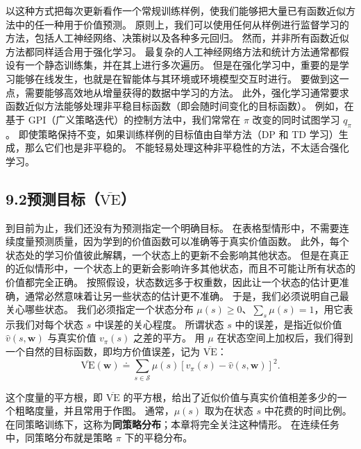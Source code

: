 \documentclass[UTF8,12pt,a4paper,fontset=fandol]{ctexart}
\begin{document}
以这种方式把每次更新看作一个常规训练样例，使我们能够把大量已有函数近似方法中的任一种用于价值预测。
原则上，我们可以使用任何从样例进行监督学习的方法，包括人工神经网络、决策树以及各种多元回归。
然而，并非所有函数近似方法都同样适合用于强化学习。
最复杂的人工神经网络方法和统计方法通常都假设有一个静态训练集，并在其上进行多次遍历。
但是在强化学习中，重要的是学习能够在线发生，也就是在智能体与其环境或环境模型交互时进行。
要做到这一点，需要能够高效地从增量获得的数据中学习的方法。
此外，强化学习通常要求函数近似方法能够处理非平稳目标函数（即会随时间变化的目标函数）。
例如，在基于 GPI（广义策略迭代）的控制方法中，我们常常在 $\pi$ 改变的同时试图学习 $q_\pi$。
即使策略保持不变，如果训练样例的目标值由自举方法（DP 和 TD 学习）生成，那么它们也是非平稳的。
不能轻易处理这种非平稳性的方法，不太适合强化学习。

\subsection*{9.2\quad 预测目标（$\overline{\mathrm{VE}}$）}

到目前为止，我们还没有为预测指定一个明确目标。
在表格型情形中，不需要连续度量预测质量，因为学到的价值函数可以准确等于真实价值函数。
此外，每个状态处的学习价值彼此解耦，一个状态上的更新不会影响其他状态。
但是在真正的近似情形中，一个状态上的更新会影响许多其他状态，而且不可能让所有状态的价值都完全正确。
按照假设，状态数远多于权重数，因此让一个状态的估计更准确，通常必然意味着让另一些状态的估计更不准确。
于是，我们必须说明自己最关心哪些状态。
我们必须指定一个状态分布 $\mu(s)\ge 0$、$\sum_s\mu(s)=1$，用它表示我们对每个状态 $s$ 中误差的关心程度。
所谓状态 $s$ 中的误差，是指近似价值 $\hat{v}(s,\mathbf{w})$ 与真实价值 $v_\pi(s)$ 之差的平方。
用 $\mu$ 在状态空间上加权后，我们得到一个自然的目标函数，即均方价值误差，记为 $\overline{\mathrm{VE}}$：
\begin{equation}
\overline{\mathrm{VE}}(\mathbf{w})\doteq
\sum_{s\in\mathcal{S}}\mu(s)\left[v_\pi(s)-\hat{v}(s,\mathbf{w})\right]^2.
\tag{9.1}
\end{equation}

这个度量的平方根，即 $\overline{\mathrm{VE}}$ 的平方根，给出了近似价值与真实价值相差多少的一个粗略度量，并且常用于作图。
通常，$\mu(s)$ 取为在状态 $s$ 中花费的时间比例。
在同策略训练下，这称为\textbf{同策略分布}；本章将完全关注这种情形。
在连续任务中，同策略分布就是策略 $\pi$ 下的平稳分布。
\end{document}
